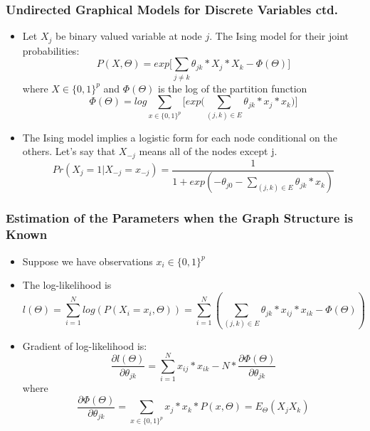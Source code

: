 \documentclass{beamer}
\begin{document}
\begin{frame}
\frametitle{Undirected Graphical Models for Discrete Variables ctd.}
\begin{itemize}
\item Let $X_j$ be binary valued variable at node $j$. The Ising model for their joint  probabilities:
\begin{equation}
P(X, \Theta) = exp\Big[\sum_{j \neq k} \theta_{jk} * X_j * X_k - \Phi(\Theta)\Big]
\end{equation}
where $X \in \{0, 1\}^p$ and $\Phi(\Theta)$ is the log of the partition function
\begin{equation}
\Phi(\Theta)=log \sum_{x \in \{0, 1\}^p} \Big[exp \Big( \sum_{(j, k) \in E} \theta_{jk} * x_j * x_k \Big) \Big] 
\end{equation}
\item The Ising model implies a logistic form for each node conditional on the others. Let's say that $X_{-j}$ means all of the nodes except j.
\begin{equation}
Pr(X_j=1 | X_{-j}=x_{-j})=\frac{1}{1 + exp(-\theta_{j0} - \sum_{(j, k) \in E} \theta_{jk} * x_k)}
\end{equation}
\end{itemize}
\end{frame}

\begin{frame}
\frametitle{ Estimation of the Parameters when the Graph Structure is Known}
\begin{itemize}
\item Suppose we have observations $x_i \in \{0,1\}^p$
\item The log-likelihood is
\begin{equation}
l(\Theta) = \sum_{i=1}^N log( P(X_i = x_i, \Theta)) = \sum_{i=1}^N (\sum_{(j, k) \in E} \theta_{jk} * x_{ij} * x_{ik} - \Phi(\Theta))
\end{equation} 
\item Gradient of log-likelihood is:
\begin{equation}
\frac{\partial l(\Theta)}{\partial \theta_{jk}} = \sum_{i=1}^N x_{ij} * x_{ik} - N * \frac{\partial \Phi(\Theta)}{\partial \theta_{jk}} 
\end{equation}
where
\begin{equation}
\frac{\partial \Phi(\Theta)}{\partial \theta_{jk}}  = \sum_{x \in \{0, 1\}^p} x_j * x_k * P(x, \Theta)= E_{\Theta}(X_jX_k)
\end{equation}
\end{itemize}
\end{frame}
\end{document}
